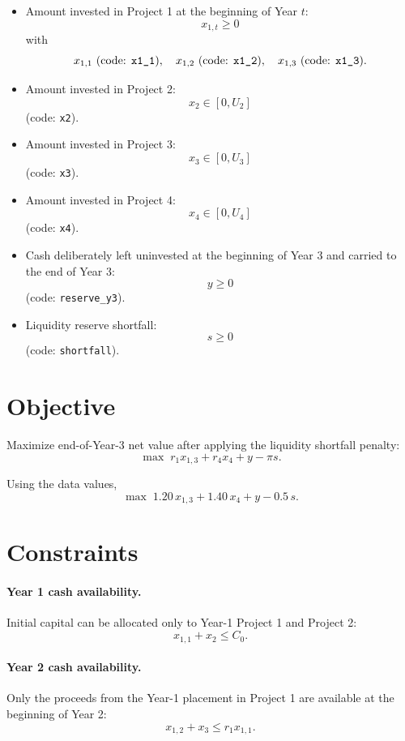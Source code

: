 \begin{itemize}
    \item Amount invested in Project 1 at the beginning of Year $t$:
    \[
    x_{1,t} \ge 0
    \]
    with
    \[
    x_{1,1} \text{ (code: \texttt{x1\_1})},\quad
    x_{1,2} \text{ (code: \texttt{x1\_2})},\quad
    x_{1,3} \text{ (code: \texttt{x1\_3})}.
    \]
    \item Amount invested in Project 2:
    \[
    x_2 \in [0,U_2]
    \]
    (code: \texttt{x2}).
    \item Amount invested in Project 3:
    \[
    x_3 \in [0,U_3]
    \]
    (code: \texttt{x3}).
    \item Amount invested in Project 4:
    \[
    x_4 \in [0,U_4]
    \]
    (code: \texttt{x4}).
    \item Cash deliberately left uninvested at the beginning of Year 3 and carried to the end of Year 3:
    \[
    y \ge 0
    \]
    (code: \texttt{reserve\_y3}).
    \item Liquidity reserve shortfall:
    \[
    s \ge 0
    \]
    (code: \texttt{shortfall}).
\end{itemize}

\section*{Objective}

Maximize end-of-Year-3 net value after applying the liquidity shortfall penalty:
\[
\max \; r_1 x_{1,3} + r_4 x_4 + y - \pi s.
\]

Using the data values,
\[
\max \; 1.20\,x_{1,3} + 1.40\,x_4 + y - 0.5\,s.
\]

\section*{Constraints}

\paragraph{Year 1 cash availability.}
Initial capital can be allocated only to Year-1 Project 1 and Project 2:
\[
x_{1,1} + x_2 \le C_0.
\]

\paragraph{Year 2 cash availability.}
Only the proceeds from the Year-1 placement in Project 1 are available at the beginning of Year 2:
\[
x_{1,2} + x_3 \le r_1 x_{1,1}.
\]

